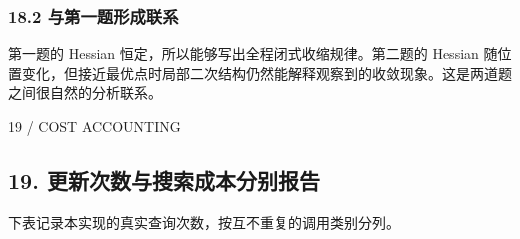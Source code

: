 \documentclass[10pt,a4paper]{article}
\newcommand{\eyebrow}[1]{{\sffamily\fontsize{8.3}{12}\selectfont\color{navy}#1}\par\vspace{4pt}{\color{navy}\hrule height 1pt}\vspace{12pt}}
\begin{document}
\subsubsection{18.2
与第一题形成联系}\label{ux4e0eux7b2cux4e00ux9898ux5f62ux6210ux8054ux7cfb}

第一题的 Hessian 恒定，所以能够写出全程闭式收缩规律。第二题的 Hessian
随位置变化，但接近最优点时局部二次结构仍然能解释观察到的收敛现象。这是两道题之间很自然的分析联系。

\clearpage

\eyebrow{19 / COST ACCOUNTING}

\subsection{19.
更新次数与搜索成本分别报告}\label{ux66f4ux65b0ux6b21ux6570ux4e0eux641cux7d22ux6210ux672cux5206ux522bux62a5ux544a}

下表记录本实现的真实查询次数，按互不重复的调用类别分列。
\end{document}

